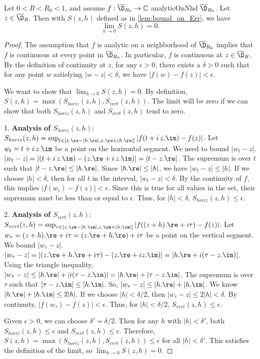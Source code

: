 \begin{lemma}\label{lem:limit_of_S_is_zero}
\leanok
Let $0<R<R_0<1$, and assume $f:\overline{\D}_{R_0}\to\mathbb{C}$ analyticOnNhd $\overline{\D}_{R_0}$. Let $z \in \overline{\D}_{R}$. Then with $S(z,h)$ defined as in \cref{lem:bound_on_Err}, we have
\[ \lim_{h\to 0} S(z,h) = 0. \]
\end{lemma}
\begin{proof}
\leanok
The assumption that $f$ is analytic on a neighborhood of $\overline{\D}_{R_0}$ implies that $f$ is continuous at every point in $\overline{\D}_{R_0}$. In particular, $f$ is continuous at $z \in \overline{\D}_{R}$.
By the definition of continuity at $z$, for any $\epsilon > 0$, there exists a $\delta > 0$ such that for any point $w$ satisfying $|w-z| < \delta$, we have $|f(w) - f(z)| < \epsilon$.

We want to show that $\lim_{h\to 0} S(z,h) = 0$. By definition, $S(z,h) = \max(S_{horiz}(z,h), S_{vert}(z,h))$. The limit will be zero if we can show that both $S_{horiz}(z,h)$ and $S_{vert}(z,h)$ tend to zero.

1.  \textbf{Analysis of $S_{horiz}(z,h)$}:
    $S_{horiz}(z,h) = \sup_{t \in [z.\re - |h.\re|, z.\re + |h.\re|]} |f(t + i\,z.\im) - f(z)|$.
    Let $w_t = t + i\,z.\im$ be a point on the horizontal segment. We need to bound $|w_t - z|$.
    $|w_t - z| = |(t + i\,z.\im) - (z.\re + i\,z.\im)| = |t - z.\re|$.
    The supremum is over $t$ such that $|t - z.\re| \le |h.\re|$. Since $|h.\re| \le |h|$, we have $|w_t - z| \le |h|$.
    If we choose $|h| < \delta$, then for all $t$ in the interval, $|w_t - z| < \delta$. By the continuity of $f$, this implies $|f(w_t) - f(z)| < \epsilon$. Since this is true for all values in the set, their supremum must be less than or equal to $\epsilon$. Thus, for $|h|<\delta$, $S_{horiz}(z,h) \le \epsilon$.

2.  \textbf{Analysis of $S_{vert}(z,h)$}:
    $S_{vert}(z,h) = \sup_{\tau \in [z.\im - |h.\im|, z.\im + |h.\im|]} |f((z+h).\re + i\tau) - f(z)|$.
    Let $w_\tau = (z+h).\re + i\tau = (z.\re + h.\re) + i\tau$ be a point on the vertical segment. We bound $|w_\tau - z|$.
    $|w_\tau - z| = |(z.\re + h.\re + i\tau) - (z.\re + i z.\im)| = |h.\re + i(\tau - z.\im)|$.
    Using the triangle inequality, $|w_\tau - z| \le |h.\re| + |i(\tau - z.\im)| = |h.\re| + |\tau - z.\im|$.
    The supremum is over $\tau$ such that $|\tau - z.\im| \le |h.\im|$.
    So, $|w_\tau - z| \le |h.\re| + |h.\im|$. We know $|h.\re| + |h.\im| \le 2|h|$.
    If we choose $|h| < \delta/2$, then $|w_\tau - z| \le 2|h| < \delta$. By continuity, $|f(w_\tau) - f(z)| < \epsilon$.
    Thus, for $|h|<\delta/2$, $S_{vert}(z,h) \le \epsilon$.

Given $\epsilon > 0$, we can choose $\delta' = \delta/2$. Then for any $h$ with $|h| < \delta'$, both $S_{horiz}(z,h) \le \epsilon$ and $S_{vert}(z,h) \le \epsilon$.
Therefore, $S(z,h) = \max(S_{horiz}(z,h), S_{vert}(z,h)) \le \epsilon$ for all $|h| < \delta'$.
This satisfies the definition of the limit, so $\lim_{h\to 0} S(z,h) = 0$.
\end{proof}

